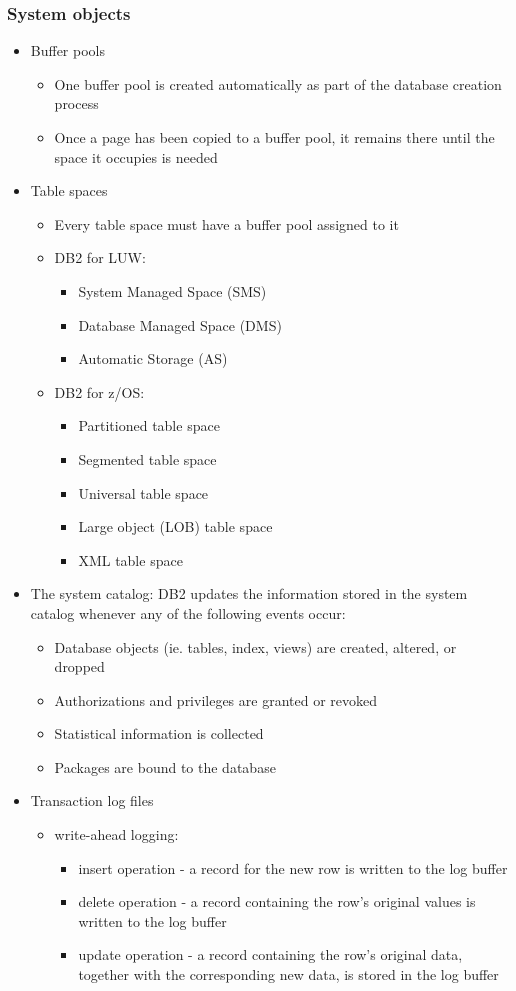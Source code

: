 \documentclass{article}
\begin{document}
\subsubsection{System objects}
	\begin{itemize}
	\item Buffer pools
		\begin{itemize}
			\item One buffer pool is created automatically as part of the database creation process
			\item Once a page has been copied to a buffer pool, it remains there until the space it occupies is needed
		\end{itemize}
	\item Table spaces
		\begin{itemize}
		\item Every table space must have a buffer pool assigned to it
		\item DB2 for LUW:
			\begin{itemize}
			\item System Managed Space (SMS)
			\item Database Managed Space (DMS)
			\item Automatic Storage (AS)
			\end{itemize}
		\item DB2 for z/OS:
			\begin{itemize}
			\item Partitioned table space
			\item Segmented table space
			\item Universal table space
			\item Large object (LOB) table space
			\item XML table space
			\end{itemize}
		\end{itemize}
	\item The system catalog: DB2 updates the information stored in the system catalog whenever any
	of the following events occur:
		\begin{itemize}
		\item Database objects (ie. tables, index, views) are created, altered, or dropped
		\item Authorizations and privileges are granted or revoked
		\item Statistical information is collected
		\item Packages are bound to the database
		\end{itemize}
	\item Transaction log files
		\begin{itemize}
		\item write-ahead logging:
			\begin{itemize}
			\item insert operation - a record for the new row is written to the log buffer
			\item delete operation - a record containing the row's original values is written to the log
			buffer
			\item update operation - a record containing the row's original data, together with the 
			corresponding new data, is stored in the log buffer
			

\end{itemize}
\end{itemize}
\end{itemize}
\end{document}
